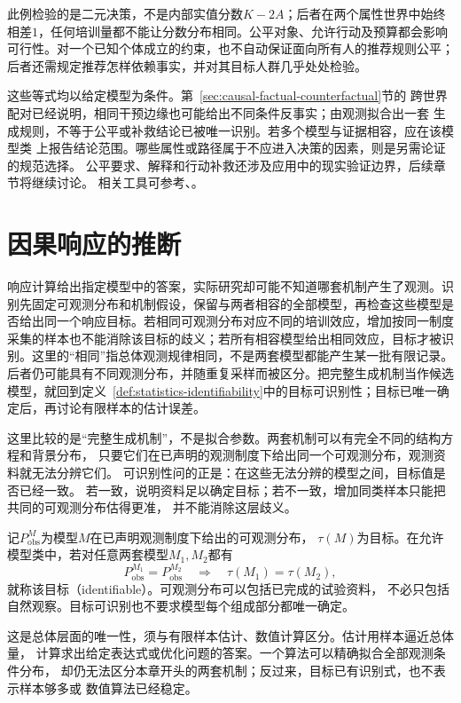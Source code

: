 此例检验的是二元决策，不是内部实值分数\(K-2A\)；后者在两个属性世界中始终
相差\(1\)，任何培训量都不能让分数分布相同。公平对象、允许行动及预算都会影响
可行性。对一个已知个体成立的约束，也不自动保证面向所有人的推荐规则公平；
后者还需规定推荐怎样依赖事实，并对其目标人群几乎处处检验。

这些等式均以给定模型为条件。第~\ref{sec:causal-factual-counterfactual}节的
跨世界配对已经说明，相同干预边缘也可能给出不同条件反事实；由观测拟合出一套
生成规则，不等于公平或补救结论已被唯一识别。若多个模型与证据相容，应在该模型类
上报告结论范围。哪些属性或路径属于不应进入决策的因素，则是另需论证的规范选择。
公平要求、解释和行动补救还涉及应用中的现实验证边界，后续章节将继续讨论。
相关工具可参考、。

\section{因果响应的推断}
\label{sec:causal-effect-identification}

响应计算给出指定模型中的答案，实际研究却可能不知道哪套机制产生了观测。识别先固定可观测分布和机制假设，保留与两者相容的全部模型，再检查这些模型是否给出同一个响应目标。若相同可观测分布对应不同的培训效应，增加按同一制度采集的样本也不能消除该目标的歧义；若所有相容模型给出相同效应，目标才被识别。这里的“相同”指总体观测规律相同，不是两套模型都能产生某一批有限记录。后者仍可能具有不同观测分布，并随重复采样而被区分。把完整生成机制当作候选模型，就回到定义~\ref{def:statistics-identifiability}中的目标可识别性；目标已唯一确定后，再讨论有限样本的估计误差。

这里比较的是“完整生成机制”，不是拟合参数。两套机制可以有完全不同的结构方程和背景分布，
只要它们在已声明的观测制度下给出同一个可观测分布，观测资料就无法分辨它们。
可识别性问的正是：在这些无法分辨的模型之间，目标值是否已经一致。
若一致，说明资料足以确定目标；若不一致，增加同类样本只能把共同的可观测分布估得更准，
并不能消除这层歧义。

记\(P_{\mathrm{obs}}^M\)为模型\(M\)在已声明观测制度下给出的可观测分布，
\(\tau(M)\)为目标。在允许模型类中，若对任意两套模型\(M_1,M_2\)都有
\[
  P_{\mathrm{obs}}^{M_1}=P_{\mathrm{obs}}^{M_2}
  \quad\Longrightarrow\quad \tau(M_1)=\tau(M_2),
\]
就称该目标（identifiable）。可观测分布可以包括已完成的试验资料，
不必只包括自然观察。目标可识别也不要求模型每个组成部分都唯一确定。

这是总体层面的唯一性，须与有限样本估计、数值计算区分。估计用样本逼近总体量，
计算求出给定表达式或优化问题的答案。一个算法可以精确拟合全部观测条件分布，
却仍无法区分本章开头的两套机制；反过来，目标已有识别式，也不表示样本够多或
数值算法已经稳定。

